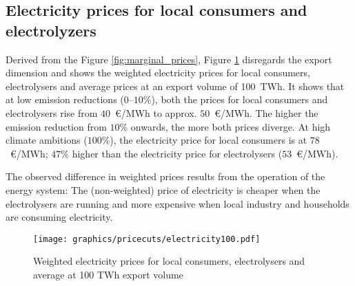 \subsection{Electricity prices for local consumers and electrolyzers}
\label{subsec:economic_benefits}
Derived from the Figure \ref{fig:marginal_prices}, Figure \ref{fig:pricecut} disregards the export dimension and shows the weighted electricity prices for local consumers, electrolysers and average prices at an export volume of 100~TWh. It shows that at low emission reductions ($0$--$10$\%), both the prices for local consumers and electrolysers rise from $40$~\euro/MWh to approx. $50$~\euro/MWh. The higher the emission reduction from $10$\% onwards, the more both prices diverge. At high climate ambitions ($100$\%), the electricity price for local consumers is at $78$~\euro/MWh; $47$\% higher than the electricity price for electrolysers ($53$~\euro/MWh).

The observed difference in weighted prices results from the operation of the energy system: The (non-weighted) price of electricity is cheaper when the electrolysers are running and more expensive when local industry and households are consuming electricity.

\begin{figure}[h!]
    \centering
    \texttt{[image: graphics/pricecuts/electricity100.pdf]}
    \caption{Weighted electricity prices for local consumers, electrolysers and average at 100 TWh export volume}
    \label{fig:pricecut}
\end{figure}


